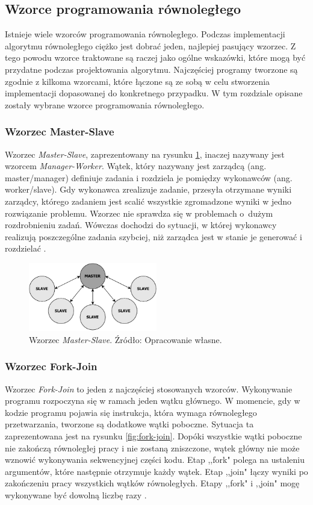\documentclass[12pt]{article}
\begin{document}
\subsection{Wzorce programowania równoległego}
Istnieje wiele wzorców programowania równoległego. Podczas implementacji algorytmu równoległego ciężko jest dobrać jeden, najlepiej pasujący wzorzec.
Z tego powodu wzorce traktowane są raczej jako ogólne wskazówki, które mogą być przydatne podczas projektowania algorytmu. Najczęściej programy
tworzone są zgodnie z kilkoma wzorcami, które łączone są ze sobą w celu stworzenia implementacji dopasowanej do konkretnego przypadku.
W tym rozdziale opisane zostały wybrane wzorce programowania równoległego.

\subsubsection{Wzorzec Master-Slave}
Wzorzec \textit{Master-Slave}, zaprezentowany na rysunku \ref{fig:master-slave}, inaczej nazywany jest wzorcem \textit{Manager-Worker}. Wątek, który nazywany jest zarządcą (ang. master/manager)
definiuje zadania i rozdziela je pomiędzy wykonawców (ang. worker/slave). Gdy wykonawca zrealizuje zadanie, przesyła
otrzymane wyniki zarządcy, którego zadaniem jest scalić wszystkie zgromadzone wyniki w jedno rozwiązanie problemu.
Wzorzec nie sprawdza się w problemach o~dużym rozdrobnieniu zadań. Wówczas dochodzi do sytuacji, w której wykonawcy realizują poszczególne zadania
szybciej, niż zarządca jest w stanie je generować i rozdzielać \cite{wprowadzenie-do-obliczen-rownoleglych}.

\begin{figure}[H]
    \centering
	\includegraphics[width=0.5\textwidth]{patterns-master-slave.pdf}
    \caption{Wzorzec \textit{Master-Slave}. Źródło: Opracowanie własne.}
    \label{fig:master-slave}
\end{figure}

\subsubsection{Wzorzec Fork-Join}
Wzorzec \textit{Fork-Join} to jeden z najczęściej stosowanych wzorców. Wykonywanie programu rozpoczyna się
w ramach jeden wątku głównego. W momencie, gdy w kodzie programu pojawia się instrukcja, która wymaga
równoległego przetwarzania, tworzone są dodatkowe wątki poboczne. Sytuacja ta zaprezentowana jest na rysunku \ref{fig:fork-join}. Dopóki wszystkie
wątki poboczne nie zakończą równoległej pracy i nie zostaną zniszczone, wątek główny nie może wznowić wykonywania
sekwencyjnej części kodu. Etap ,,fork" polega na ustaleniu argumentów, które następnie otrzymuje każdy wątek.
Etap ,,join" łączy wyniki po zakończeniu pracy wszystkich wątków równoległych. Etapy ,,fork" i ,,join"
mogę wykonywane być dowolną liczbę razy \cite{parallel-design-patterns}.
\end{document}

